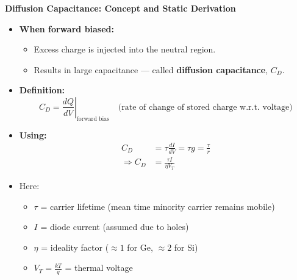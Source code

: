 \begin{frame}{\textbf{Diffusion Capacitance: Concept and Static Derivation}}
	\begin{itemize}
		\item \textbf{When forward biased:}
		\begin{itemize}
			\item Excess charge is injected into the neutral region.
			\item Results in large capacitance — called \textbf{diffusion capacitance}, $C_D$.
		\end{itemize}
		
		\item \textbf{Definition:}
		\[
		C_D = \left. \frac{dQ}{dV} \right|_{\text{forward bias}} \quad \text{(rate of change of stored charge w.r.t. voltage)}
		\]
	
		\item \textbf{Using:}
		\begin{align*}
			C_D &= \tau \frac{dI}{dV} = \tau g = \frac{\tau}{r} \tag{3-27} \\
			\Rightarrow C_D &= \frac{\tau I}{\eta V_T} \tag{3-28}
		\end{align*}
		\item Here:
		\begin{itemize}
			\item $\tau$ = carrier lifetime (mean time minority carrier remains mobile)
			\item $I$ = diode current (assumed due to holes)
			\item $\eta$ = ideality factor ($\approx 1$ for Ge, $\approx 2$ for Si)
			\item $V_T = \frac{kT}{q}$ = thermal voltage
		\end{itemize}
	\end{itemize}
	\end{frame}

